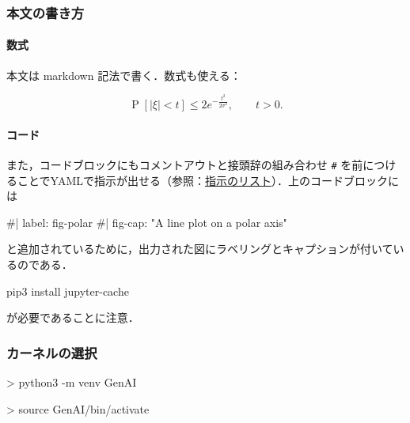 \documentclass[
]{ltjsarticle}
\newenvironment{Shaded}{\begin{snugshade}}{\end{snugshade}}
\newcommand{\CommentTok}[1]{\textcolor[rgb]{0.37,0.37,0.37}{#1}}
\newcommand{\ExtensionTok}[1]{\textcolor[rgb]{0.00,0.23,0.31}{#1}}
\newcommand{\NormalTok}[1]{\textcolor[rgb]{0.00,0.23,0.31}{#1}}
\newcommand{\OperatorTok}[1]{\textcolor[rgb]{0.37,0.37,0.37}{#1}}
\begin{document}
\subsubsection{本文の書き方}\label{ux672cux6587ux306eux66f8ux304dux65b9}

\paragraph{数式}\label{ux6570ux5f0f}

本文は markdown 記法で書く．数式も使える：

\[
\operatorname{P}[\lvert\xi\rvert<t]\le2e^{-\frac{t^2}{2\sigma^2}},\qquad t>0.
\]

\paragraph{コード}\label{ux30b3ux30fcux30c9}

また，コードブロックにもコメントアウトと接頭辞の組み合わせ
\texttt{\#\textbar{}}
を前につけることでYAMLで指示が出せる（参照：\href{https://quarto.org/docs/reference/cells/cells-jupyter.html}{指示のリスト}）．上のコードブロックには

\begin{Shaded}
\begin{Highlighting}[]
\CommentTok{\#| label: fig{-}polar}
\CommentTok{\#| fig{-}cap: "A line plot on a polar axis"}
\end{Highlighting}
\end{Shaded}

と追加されているために，出力された図にラベリングとキャプションが付いているのである．

\begin{Shaded}
\begin{Highlighting}[]
\ExtensionTok{pip3}\NormalTok{ install jupyter{-}cache}
\end{Highlighting}
\end{Shaded}

が必要であることに注意．

\subsubsection{カーネルの選択}\label{ux30abux30fcux30cdux30ebux306eux9078ux629e}

\begin{Shaded}
\begin{Highlighting}[]
\OperatorTok{\textgreater{}}\NormalTok{ python3 }\ExtensionTok{{-}m}\NormalTok{ venv GenAI}

\OperatorTok{\textgreater{}}\NormalTok{ source }\ExtensionTok{GenAI/bin/activate}
\end{Highlighting}
\end{Shaded}
\end{document}
